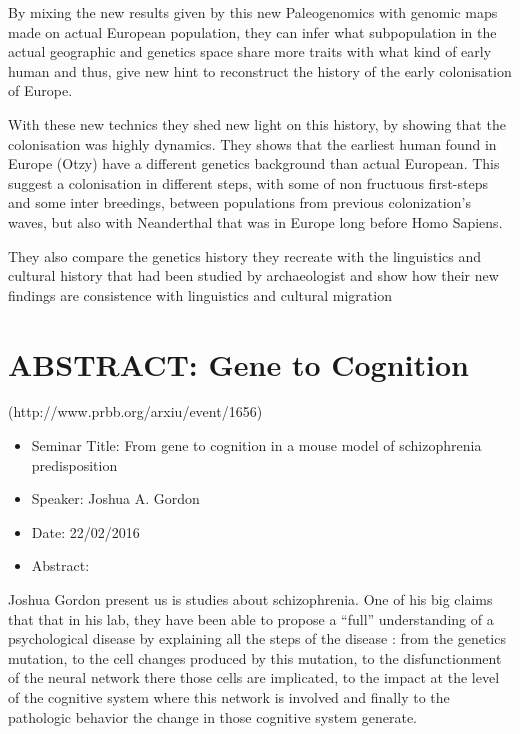\documentclass[10pt,letterpaper]{article}
\begin{document}
By mixing the new results given by this new Paleogenomics with genomic maps made on actual European population, they can infer what subpopulation in the actual geographic and genetics space share more traits with what kind of early human and thus, give new hint to reconstruct the history of the early colonisation of Europe.

With these new technics they shed new light on this history, by showing that the colonisation was highly dynamics. They shows that the earliest human found in Europe (Otzy) have a different genetics background than actual European. This suggest a colonisation in different steps, with some of non fructuous first-steps and some inter breedings, between populations from previous colonization's waves, but also with Neanderthal that was in Europe long before Homo Sapiens.

They also compare the genetics history they recreate with the linguistics and cultural history that had been studied by archaeologist and show how their new findings are consistence with linguistics and cultural migration



%
%
%
%


\section{ABSTRACT: Gene to Cognition}
(http://www.prbb.org/arxiu/event/1656)
\begin{itemize}
    \item Seminar Title: From gene to cognition in a mouse model of schizophrenia predisposition
    \item Speaker: Joshua A. Gordon
    \item Date: 22/02/2016
    \item Abstract:
\end{itemize}
Joshua Gordon present us is studies about schizophrenia. One of his big claims that that in his lab, they have been able to propose a ``full'' understanding of a psychological disease by explaining all the steps of the disease : from the genetics mutation, to the cell changes produced by this mutation, to the disfunctionment of the neural network there those cells are implicated, to the impact at the level of the cognitive system where this network is involved and finally to the pathologic behavior the change in those cognitive system generate.  
\end{document}

